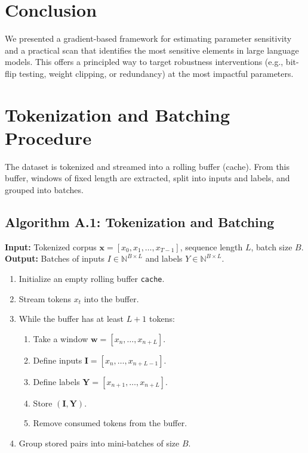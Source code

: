 \documentclass[12pt]{article}
\begin{document}
\section{Conclusion}
We presented a gradient-based framework for estimating parameter sensitivity and a practical scan that identifies the most sensitive elements in large language models. 
This offers a principled way to target robustness interventions (e.g., bit-flip testing, weight clipping, or redundancy) at the most impactful parameters.

\appendix

\section{Tokenization and Batching Procedure}
The dataset is tokenized and streamed into a rolling buffer (cache). From this buffer, windows of fixed length are extracted, split into inputs and labels, and grouped into batches.

\subsection*{Algorithm A.1: Tokenization and Batching}
\textbf{Input:} Tokenized corpus $\mathbf{x} = [x_0, x_1, \ldots, x_{T-1}]$, sequence length $L$, batch size $B$. \\
\textbf{Output:} Batches of inputs $I \in \mathbb{N}^{B \times L}$ and labels $Y \in \mathbb{N}^{B \times L}$.

\begin{enumerate}
  \item Initialize an empty rolling buffer \texttt{cache}.
  \item Stream tokens $x_t$ into the buffer.
  \item While the buffer has at least $L+1$ tokens:
  \begin{enumerate}
    \item Take a window $\mathbf{w} = [x_n, \ldots, x_{n+L}]$.
    \item Define inputs $\mathbf{I} = [x_n, \ldots, x_{n+L-1}]$.
    \item Define labels $\mathbf{Y} = [x_{n+1}, \ldots, x_{n+L}]$.
    \item Store $(\mathbf{I}, \mathbf{Y})$.
    \item Remove consumed tokens from the buffer.
  \end{enumerate}
  \item Group stored pairs into mini-batches of size $B$.
\end{enumerate}
\end{document}
